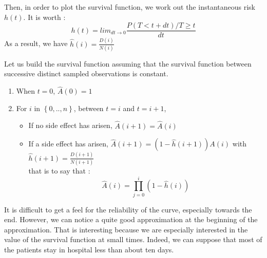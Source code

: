 \documentclass[12pt,twoside]{article}
\begin{document}
Then, in order to plot the survival function, we work out the instantaneous risk $h(t)$. It is worth :
\begin{equation}
h(t)=lim_{dt\rightarrow 0}\frac{P(T<t+dt)/ T \geq t}{dt}
\end{equation}
As a result, we have $\hat h(i)=\frac{D(i)}{N(i)}$


Let us build the survival function assuming that the survival function between successive distinct sampled observations is constant.
\begin{enumerate}
	\item When $t=0$, $\hat A(0)=1$
	\item For $i$ in $\left\{ 0,..,n \right\}$, between $t=i$ and $t=i+1$, 	
		\begin{itemize}
			\item If no side effect has arisen, $\hat A(i+1)=\hat A(i)$
			\item If a side effect has arisen, $\hat A(i+1)=(1- \hat h(i+1))A(i)$ with $\hat h(i+1)=\frac{D(i+1)}{N(i+1)}$\\
			that is to say that : $$
			\hat A(i) = \prod_{j=0}^{i}(1-\hat h(i))
			$$
		\end{itemize}
\end{enumerate}

It is difficult to get a feel for the reliability of the curve, especially towards the end. However, we can notice a quite good approximation at the beginning of the approximation. That is interesting because we are especially interested in the value of the survival function at small times. Indeed, we can suppose that most of the patients stay in hospital less than about ten days.

\end{document}

